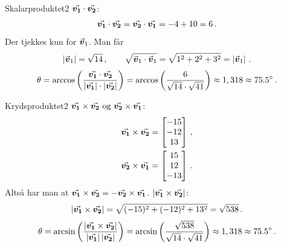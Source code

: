 \begin{opgave}{Skalarproduktet}{2}
	\opg ${\vec{\boldsymbol{v_1}}}\cdot {\vec{\boldsymbol{v_2}}}$:
	\begin{align*}
	{\vec{\boldsymbol{v_1}}}\cdot {\vec{\boldsymbol{v_2}}} = {\vec{\boldsymbol{v_2}}}\cdot {\vec{\boldsymbol{v_1}}} = -4+10 = 6 \, .
	\end{align*}
	\opg Der tjekkes kun for ${\vec{\boldsymbol{v}}}_1$. Man får
	\begin{align*}
	\left| {\vec{\boldsymbol{v}}}_1 \right| = \sqrt{14} \, , \qquad \sqrt{{\vec{\boldsymbol{v}}}_1 \cdot {\vec{\boldsymbol{v}}}_1} = \sqrt{1^2+2^2+3^2} = \left| {\vec{\boldsymbol{v}}}_1 \right| \, .
	\end{align*}
	\opg
	\begin{align*}
	\theta = \arccos \left( \frac{{\vec{\boldsymbol{v_1}}}\cdot {\vec{\boldsymbol{v_2}}}}{\left| {\vec{\boldsymbol{v_1}}} \right|\cdot\left| {\vec{\boldsymbol{v_2}}} \right|} \right)  = \arccos \left({\frac{6}{\sqrt{14}\cdot\sqrt{41}}}\right) \approx 1,318 \approx \ang{75,5} \, .
	\end{align*}
\end{opgave}
\begin{opgave}{Krydsproduktet}{2}
	\opg ${\vec{\boldsymbol{v_1}}} \times {\vec{\boldsymbol{v_2}}} \, \,  \text{og} \, \,  {\vec{\boldsymbol{v_2}}}\times {\vec{\boldsymbol{v_1}}}$:
	\begin{align*}
	{\vec{\boldsymbol{v_1}}} \times {\vec{\boldsymbol{v_2}}} &=  \begin{bmatrix} -15 \\ -12 \\ 13 \end{bmatrix} \, , \\
	{\vec{\boldsymbol{v_2}}} \times {\vec{\boldsymbol{v_1}}} &= \begin{bmatrix} 15 \\ 12 \\ -13 \end{bmatrix} \, .
	\end{align*}
	Altså har man at $	{\vec{\boldsymbol{v_1}}} \times {\vec{\boldsymbol{v_2}}} = - {\vec{\boldsymbol{v_2}}} \times {\vec{\boldsymbol{v_1}}}$.
	\opg $\left| {\vec{\boldsymbol{v_1}}} \times {\vec{\boldsymbol{v_2}}} \right|$:
	\begin{align*}
	\left| {\vec{\boldsymbol{v_1}}} \times {\vec{\boldsymbol{v_2}}} \right| = \sqrt{(-15)^2+(-12)^2+13^2} = \sqrt{538} \, .
	\end{align*}
	\opg 
	\begin{align*}
	\theta = \arcsin\left(\frac{\left| {\vec{\boldsymbol{v_1}}} \times {\vec{\boldsymbol{v_2}}} \right|}{\left| {\vec{\boldsymbol{v_1}}} \right|\left| {\vec{\boldsymbol{v_2}}} \right|}\right) = \arcsin\left( \frac{\sqrt{538}}{\sqrt{14}\cdot\sqrt{41}} \right) \approx 1,318 \approx \ang{75,5} \, . 
	\end{align*}
\end{opgave}
